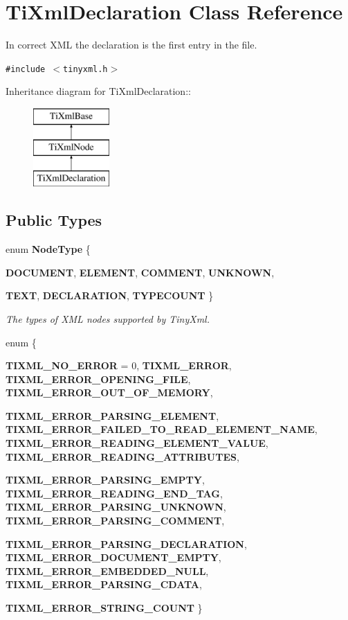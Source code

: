 \section{Ti\-Xml\-Declaration Class Reference}
\label{classTiXmlDeclaration}
In correct XML the declaration is the first entry in the file.  


{\tt \#include $<$tinyxml.h$>$}

Inheritance diagram for Ti\-Xml\-Declaration::\begin{figure}[H]
\begin{center}
\leavevmode
\includegraphics[height=3cm]{classTiXmlDeclaration}
\end{center}
\end{figure}
\subsection*{Public Types}
\begin{CompactItemize}
\item 
enum {\bf Node\-Type} \{ \par
{\bf DOCUMENT}, 
{\bf ELEMENT}, 
{\bf COMMENT}, 
{\bf UNKNOWN}, 
\par
{\bf TEXT}, 
{\bf DECLARATION}, 
{\bf TYPECOUNT}
 \}
\begin{CompactList}\small\item\em The types of XML nodes supported by Tiny\-Xml. \item\end{CompactList}\item 
enum \{ \par
{\bf TIXML\_\-NO\_\-ERROR} =  0, 
{\bf TIXML\_\-ERROR}, 
{\bf TIXML\_\-ERROR\_\-OPENING\_\-FILE}, 
{\bf TIXML\_\-ERROR\_\-OUT\_\-OF\_\-MEMORY}, 
\par
{\bf TIXML\_\-ERROR\_\-PARSING\_\-ELEMENT}, 
{\bf TIXML\_\-ERROR\_\-FAILED\_\-TO\_\-READ\_\-ELEMENT\_\-NAME}, 
{\bf TIXML\_\-ERROR\_\-READING\_\-ELEMENT\_\-VALUE}, 
{\bf TIXML\_\-ERROR\_\-READING\_\-ATTRIBUTES}, 
\par
{\bf TIXML\_\-ERROR\_\-PARSING\_\-EMPTY}, 
{\bf TIXML\_\-ERROR\_\-READING\_\-END\_\-TAG}, 
{\bf TIXML\_\-ERROR\_\-PARSING\_\-UNKNOWN}, 
{\bf TIXML\_\-ERROR\_\-PARSING\_\-COMMENT}, 
\par
{\bf TIXML\_\-ERROR\_\-PARSING\_\-DECLARATION}, 
{\bf TIXML\_\-ERROR\_\-DOCUMENT\_\-EMPTY}, 
{\bf TIXML\_\-ERROR\_\-EMBEDDED\_\-NULL}, 
{\bf TIXML\_\-ERROR\_\-PARSING\_\-CDATA}, 
\par
{\bf TIXML\_\-ERROR\_\-STRING\_\-COUNT}
 \}
\end{CompactItemize}

